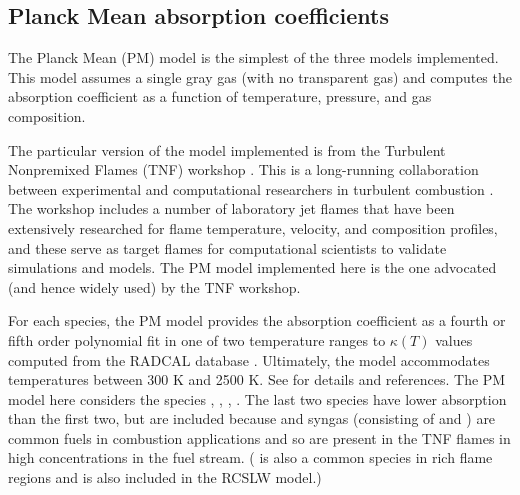 \documentclass[preprint,12pt]{elsarticle}
\begin{document}
    \begin{table}
        \caption{Summary of radiative property models in RadLib.}
        \label{t:models}
        \centering
    \end{table}

    \subsection{Planck Mean absorption coefficients} \label{s:planckmean}

    The Planck Mean (PM) model is the simplest of the three models implemented. This model assumes a single gray gas
    (with no transparent gas)
    and computes the absorption coefficient as a function of temperature, pressure, and gas composition.

    The particular version of the model implemented is from the Turbulent Nonpremixed Flames (TNF) workshop \cite{TNF}. This is a long-running collaboration between experimental and computational researchers in turbulent combustion \citep{Smith_2003,Barlow_2001}. The workshop includes a number of laboratory jet flames that have been extensively researched for flame temperature, velocity, and composition profiles, and these serve as target flames for computational scientists to validate simulations and models. The PM model implemented here is the one advocated (and hence widely used) by the TNF workshop.

    For each species, the PM model provides the absorption coefficient as a fourth or fifth order polynomial fit in one
    of two temperature ranges to $\kappa(T)$ values computed from the RADCAL database \cite{Grosshandler_1993}.
    Ultimately, the model accommodates temperatures between 300 K and 2500 K. See
    \cite{TNF} for details and references. The PM model here considers the species , , , .
    The last two species have lower absorption than the first two, but are included because  and syngas
    (consisting of  and ) are common fuels in combustion applications and so are present in the TNF flames
    in high concentrations in the fuel stream. ( is also a common species in rich flame regions and is also included in the RCSLW model.)
\end{document}

